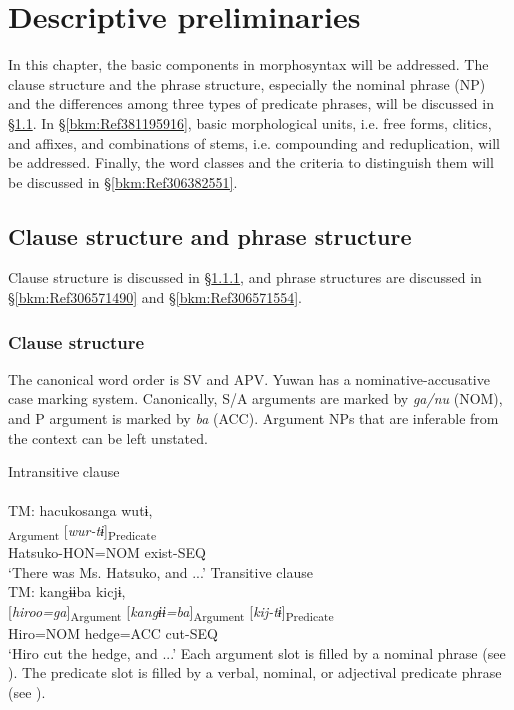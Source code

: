 \chapter{Descriptive preliminaries}\hypertarget{RefHeadingToc395696990}{}
In this chapter, the basic components in morphosyntax will be addressed. The clause structure and the phrase structure, especially the nominal phrase (NP) and the differences among three types of predicate phrases, will be discussed in §\ref{bkm:Ref381194330}. In §\ref{bkm:Ref381195916}, basic morphological units, i.e. free forms, clitics, and affixes, and combinations of stems, i.e. compounding and reduplication, will be addressed. Finally, the word classes and the criteria to distinguish them will be discussed in §\ref{bkm:Ref306382551}.

\section{Clause structure and phrase structure}
\label{bkm:Ref381194330}\hypertarget{RefHeadingToc395696991}{}
Clause structure is discussed in §\ref{bkm:Ref306660546}, and phrase structures are discussed in §\ref{bkm:Ref306571490} and §\ref{bkm:Ref306571554}.

\subsection{Clause structure}
\label{bkm:Ref306660546}\hypertarget{RefHeadingToc395696992}{}
The canonical word order is SV and APV. Yuwan has a nominative-accusative case marking system. Canonically, S/A arguments are marked by \textit{ga/nu} (NOM), and P argument is marked by \textit{ba} (ACC). Argument NPs that are inferable from the context can be left unstated.

\ea \label{ex:4.1}
\ea Intransitive clause\hfill\relax[Co: 120415\_01.txt]\\
    \\
    {TM:} \glll    hacukosanga  wutɨ,\\
                   [\textit{hacuko-san=ga}]\textsubscript{Argument}  [\textit{wur-tɨ}]\textsubscript{Predicate}\\
                   Hatsuko-HON=NOM  exist-SEQ\\
    \glt{} ‘There was Ms. Hatsuko, and ...’
\ex Transitive clause\hfill\relax[Co: 101020\_01.txt]\\
   {TM:}   {{kangɨɨba}}  {kicjɨ,}\\
                {[\textit{hiroo=ga}]\textsubscript{Argument}}  {[\textit{kangɨɨ=ba}]\textsubscript{Argument}}  {[\textit{kij-tɨ}]\textsubscript{Predicate}}\\
                {Hiro=NOM}  {{hedge=ACC}}  {cut-SEQ}\\
\glt{} ‘Hiro cut the hedge, and ...’
\z
\z
Each argument slot is filled by a nominal phrase (see ). The predicate slot is filled by a verbal, nominal, or adjectival predicate phrase (see ).

